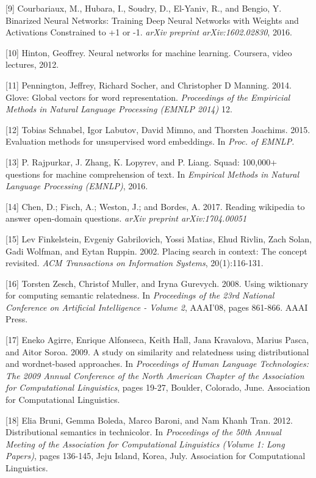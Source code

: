 \documentclass{article} %
\begin{document}
\small{[9] Courbariaux, M., Hubara, I., Soudry, D., El-Yaniv, R., and
  Bengio, Y. Binarized Neural Networks: Training Deep Neural Networks
  with Weights and Activations Constrained to +1 or -1. {\it arXiv preprint
  arXiv:1602.02830}, 2016.

\small{[10] Hinton, Geoffrey. Neural networks for machine
  learning. Coursera, video lectures, 2012.}

\small{[11] Pennington, Jeffrey, Richard Socher, and Christopher D
  Manning. 2014. Glove: Global vectors for word representation. {\it
    Proceedings of the Empiricial Methods in Natural Language
    Processing (EMNLP 2014)} 12.}

\small{[12] Tobias Schnabel, Igor Labutov, David Mimno, and Thorsten
  Joachims. 2015. Evaluation methods for unsupervised word embeddings.
  In {\it Proc. of EMNLP.}}

\small{[13] P. Rajpurkar, J. Zhang, K. Lopyrev, and P. Liang. Squad:
  100,000+ questions for machine comprehension of text. In {\it Empirical
  Methods in Natural Language Processing (EMNLP)}, 2016.}

\small{[14] Chen, D.; Fisch, A.; Weston, J.; and Bordes, A. 2017.
  Reading wikipedia to answer open-domain questions. {\it arXiv preprint
  arXiv:1704.00051}}

\small{[15] Lev Finkelstein, Evgeniy Gabrilovich, Yossi Matias, Ehud
  Rivlin, Zach Solan, Gadi Wolfman, and Eytan Ruppin. 2002. Placing
  search in context: The concept revisited. {\it ACM Transactions on
    Information Systems}, 20(1):116-131.}

\small{[16] Torsten Zesch, Christof Muller, and Iryna Gurevych.
  2008. Using wiktionary for computing semantic relatedness. In {\it
    Proceedings of the 23rd National Conference on Artificial
    Intelligence - Volume 2}, AAAI'08, pages 861-866. AAAI Press.}

\small{[17] Eneko Agirre, Enrique Alfonseca, Keith Hall, Jana
  Kravalova, Marius Pasca, and Aitor Soroa. 2009.  A study on
  similarity and relatedness using distributional and wordnet-based
  approaches. In {\it Proceedings of Human Language Technologies: The
    2009 Annual Conference of the North American Chapter of the
    Association for Computational Linguistics}, pages 19-27, Boulder,
  Colorado, June. Association for Computational Linguistics.}

\small{[18] Elia Bruni, Gemma Boleda, Marco Baroni, and Nam Khanh
  Tran. 2012. Distributional semantics in technicolor. In {\it
    Proceedings of the 50th Annual Meeting of the Association for
    Computational Linguistics (Volume 1: Long Papers)}, pages 136-145,
  Jeju Island, Korea, July. Association for Computational
  Linguistics.}

}
\end{document}
